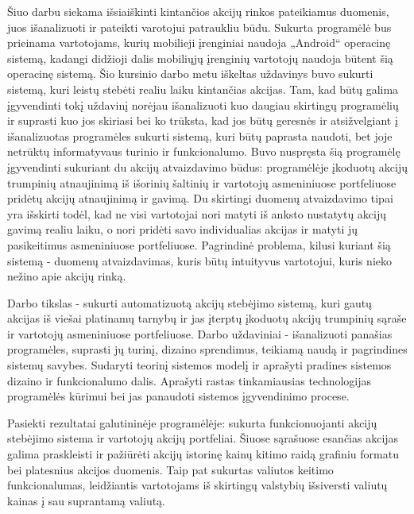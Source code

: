Šiuo darbu siekama išsiaiškinti kintančios akcijų rinkos pateikiamus duomenis, juos išanalizuoti ir pateikti varotojui patraukliu būdu. Sukurta programėlė bus prieinama vartotojams, kurių mobilieji įrenginiai naudoja „Android“ operacinę sistemą, kadangi didžioji dalis mobiliųjų įrenginių vartotojų naudoja būtent šią operacinę sistemą. Šio kursinio darbo metu iškeltas uždavinys buvo sukurti sistemą, kuri leistų stebėti realiu laiku kintančias akcijas. Tam, kad būtų galima įgyvendinti tokį uždavinį norėjau išanalizuoti kuo daugiau skirtingų programėlių ir suprasti kuo jos skiriasi bei ko trūksta, kad jos būtų geresnės ir atsižvelgiant į išanalizuotas programėles sukurti sistemą, kuri būtų paprasta naudoti, bet joje netrūktų informatyvaus turinio ir funkcionalumo. Buvo nuspręsta šią programėlę įgyvendinti sukuriant du akcijų atvaizdavimo būdus: programėlėje įkoduotų akcijų trumpinių atnaujinimą iš išorinių šaltinių ir vartotojų asmeniniuose portfeliuose pridėtų akcijų atnaujinimą ir gavimą. Du skirtingi duomenų atvaizdavimo tipai yra išskirti todėl, kad ne visi vartotojai nori matyti iš anksto nustatytų akcijų gavimą realiu laiku, o nori pridėti savo individualias akcijas ir matyti jų pasikeitimus asmeniniuose portfeliuose. Pagrindinė problema, kilusi kuriant šią sistemą - duomenų atvaizdavimas, kuris būtų intuityvus vartotojui, kuris nieko nežino apie akcijų rinką.

Darbo tikslas - sukurti automatizuotą akcijų stebėjimo sistemą, kuri gautų akcijas iš viešai platinamų tarnybų ir jas įterptų įkoduotų akcijų trumpinių sąraše ir vartotojų asmeniniuose portfeliuose. Darbo uždaviniai - išanalizuoti panašias programėles, suprasti jų turinį, dizaino sprendimus, teikiamą naudą ir pagrindines sistemų savybes. Sudaryti teorinį sistemos modelį ir aprašyti pradines sistemos dizaino ir funkcionalumo dalis. Aprašyti rastas tinkamiausias technologijas programėlės kūrimui bei jas panaudoti sistemos įgyvendinimo procese.

Pasiekti rezultatai galutininėje programėlėje: sukurta funkcionuojanti akcijų stebėjimo sistema ir vartotojų akcijų portfeliai. Šiuose sąrašuose esančias akcijas galima praskleisti ir pažiūrėti akcijų istorinę kainų kitimo raidą grafiniu formatu bei platesnius akcijos duomenis. Taip pat sukurtas valiutos keitimo funkcionalumas, leidžiantis vartotojams iš skirtingų valstybių išsiversti valiutų kainas į sau suprantamą valiutą.